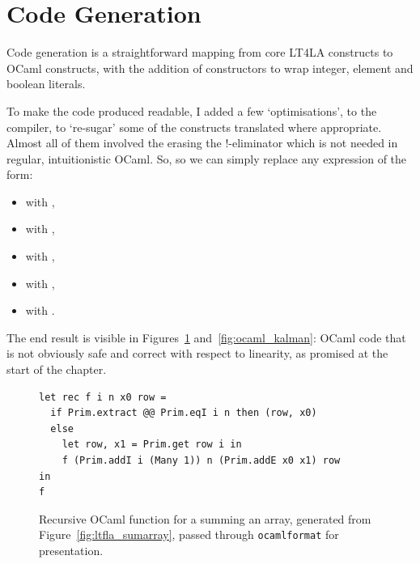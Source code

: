 \section{Code Generation}

Code generation is a straightforward mapping from core LT4LA constructs to
OCaml constructs, with the addition of  constructors to wrap
integer, element and boolean literals.

To make the code produced readable, I added a few `optimisations', to the
compiler, to `re-sugar' some of the constructs translated where appropriate.
Almost all of them involved the erasing the !-eliminator which is not needed in
regular, intuitionistic OCaml. So, so we can simply replace any expression of
the form:

\begin{itemize}

    \item {} with
        , 

    \item {} with
        ,

    \item {} with
        ,

    \item {} with ,

    \item {} with
        .

\end{itemize}

The end result is visible in Figures~\ref{fig:ocaml_sumarray}
and~\ref{fig:ocaml_kalman}: OCaml code that is not obviously safe and correct
with respect to linearity, as promised at the start of the chapter.

\begin{figure}[tp]
    \begin{verbatim}
let rec f i n x0 row =
  if Prim.extract @@ Prim.eqI i n then (row, x0)
  else
    let row, x1 = Prim.get row i in
    f (Prim.addI i (Many 1)) n (Prim.addE x0 x1) row
in
f
    \end{verbatim}
    \caption{Recursive OCaml function for a summing an array, generated from
        Figure~\ref{fig:ltfla_sumarray}, passed through \texttt{ocamlformat} for
        presentation.}\label{fig:ocaml_sumarray}

\end{figure}

